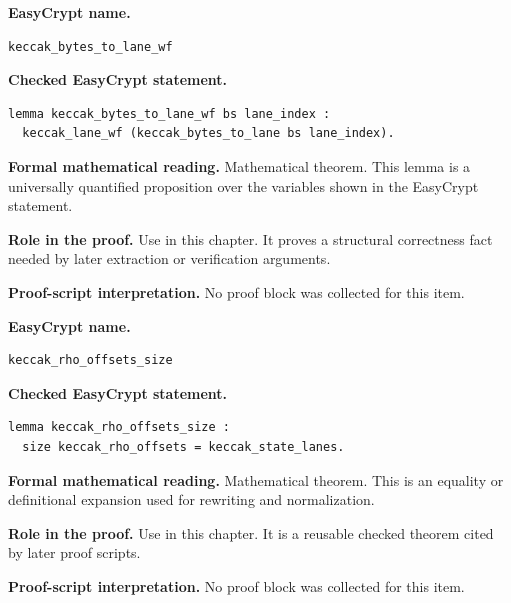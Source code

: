 \begin{formaltheorem}
\noindent\textbf{EasyCrypt name.}
\begin{lstlisting}[language=EasyCrypt,basicstyle=\ttfamily\scriptsize]
keccak_bytes_to_lane_wf
\end{lstlisting}
\noindent\textbf{Checked EasyCrypt statement.}
\begin{lstlisting}[language=EasyCrypt,basicstyle=\ttfamily\scriptsize]
lemma keccak_bytes_to_lane_wf bs lane_index :
  keccak_lane_wf (keccak_bytes_to_lane bs lane_index).
\end{lstlisting}
\noindent\textbf{Formal mathematical reading.}
Mathematical theorem. This lemma is a universally quantified proposition over the variables shown in the EasyCrypt statement.

\noindent\textbf{Role in the proof.}
Use in this chapter. It proves a structural correctness fact needed by later extraction or verification arguments.

\noindent\textbf{Proof-script interpretation.}
No proof block was collected for this item.

\end{formaltheorem}

\begin{formaltheorem}
\noindent\textbf{EasyCrypt name.}
\begin{lstlisting}[language=EasyCrypt,basicstyle=\ttfamily\scriptsize]
keccak_rho_offsets_size
\end{lstlisting}
\noindent\textbf{Checked EasyCrypt statement.}
\begin{lstlisting}[language=EasyCrypt,basicstyle=\ttfamily\scriptsize]
lemma keccak_rho_offsets_size :
  size keccak_rho_offsets = keccak_state_lanes.
\end{lstlisting}
\noindent\textbf{Formal mathematical reading.}
Mathematical theorem. This is an equality or definitional expansion used for rewriting and normalization.

\noindent\textbf{Role in the proof.}
Use in this chapter. It is a reusable checked theorem cited by later proof scripts.

\noindent\textbf{Proof-script interpretation.}
No proof block was collected for this item.

\end{formaltheorem}

